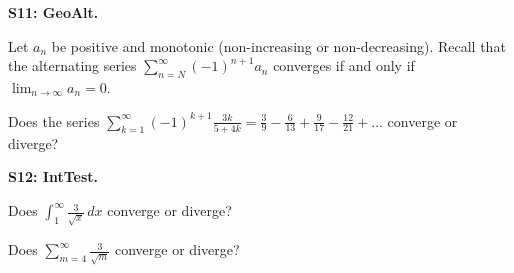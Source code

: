 \documentclass[12pt]{article}
\newcommand{\<}{\left\langle}
\renewcommand{\>}{\right\rangle}
\newcommand{\exerciseHeader}[4]{


  \vspace{0.5em}
  \textbf{#2}
  \vspace{0.5em}

}
\begin{document}
\begin{multicols}{2}
\exerciseHeader{2017 July 13}{S11: GeoAlt.}{
Determine if a geometric series or alternating series is convergent or
divergent.
}{2/3}

Let \(a_n\) be positive and monotonic (non-increasing or non-decreasing).
Recall that the alternating series \(\sum_{n=N}^\infty (-1)^{n+1} a_n\)
converges if and only if \(\lim_{n\to\infty}a_n=0\).

Does the series
\(\sum_{k=1}^\infty (-1)^{k+1}\frac{3k}{5+4k}=\frac{3}{9}-\frac{6}{13}+
\frac{9}{17}-\frac{12}{21}+\dots\)
converge or diverge?



%
%
%
%

%
%
%
%

%
%
%
%

\exerciseHeader{2017 July 14}{S12: IntTest.}{
Use the integral test to determine series convergence.
}{2/3}

Does \(\int_1^\infty\frac{3}{\sqrt{x}}\,dx\) converge or diverge?

Does \(\sum_{m=4}^\infty\frac{3}{\sqrt{m}}\) converge or diverge?



%

%


\end{multicols}
\end{document}
